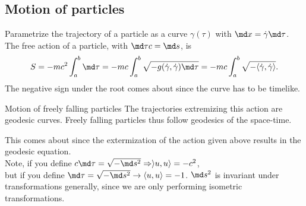 \subsection{Motion of particles}
Parametrize the trajectory of a particle as a curve $\gamma(\tau)$ with $\md x = \dot{\gamma} \md \tau$. The free action of a particle, with $\md \tau c = \md s$, is
\begin{equation}
S = - mc^2 \int_a^b \md \tau = -mc \int_a^b \sqrt{-g(\dot{\gamma},\dot{\gamma}) \md \tau} = -mc \int_a^b \sqrt{-\langle \dot{\gamma}, \dot{\gamma} \rangle}.
\end{equation}
The negative sign under the root comes about since the curve has to be timelike.
\begin{mybox}{Motion of freely falling particles}
	The trajectories extremizing this action are geodesic curves. Freely falling particles thus follow geodesics of the space-time.
\end{mybox}
This comes about since the extermization of the action given above results in the geodesic equation.\\
Note, if you define $c \md \tau = \sqrt{-\md s^2} \Rightarrow \rangle u,u \rangle = -c^2$,\\
but if you define $\md \tau = \sqrt{-\md s^2} \rightarrow \langle u,u \rangle = -1$.
$\md s^2$ is invariant under transformations generally, since we are only performing isometric transformations.





